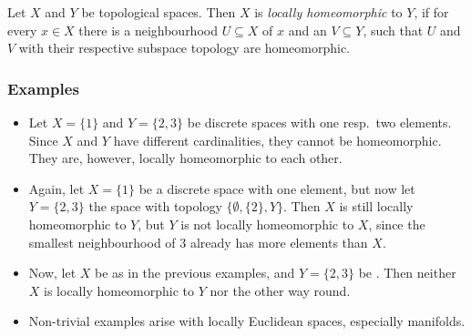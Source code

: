 \documentclass[12pt]{article}
\begin{document}
Let $X$ and $Y$ be topological spaces. Then $X$ is \emph{locally
  homeomorphic} to $Y$, if for every $x\in X$ there is a neighbourhood
  $U\subseteq X$ of $x$ and an  $V\subseteq Y$, such that $U$
  and $V$ with their respective subspace topology are homeomorphic.

\subsubsection*{Examples}
\begin{itemize}
\item Let $X=\{1\}$ and $Y=\{2,3\}$ be discrete spaces with one resp.\
  two elements. Since $X$ and $Y$ have different cardinalities,
  they cannot be homeomorphic. They are, however, locally homeomorphic
  to each other.
\item Again, let $X=\{1\}$ be a discrete space with one element, but
  now let $Y=\{2,3\}$ the space with topology
  $\{\emptyset,\{2\},Y\}$. Then $X$ is still locally homeomorphic to
  $Y$, but $Y$ is not locally homeomorphic to $X$, since the smallest
  neighbourhood of $3$ already has more elements than $X$.
\item Now, let $X$ be as in the previous examples, and $Y=\{2,3\}$
  be \PMlinkid{indiscrete}{3120}. Then neither $X$ is locally homeomorphic to $Y$ nor
  the other way round.
\item Non-trivial examples arise with locally Euclidean spaces,
  especially manifolds.
\end{itemize}
\end{document}
